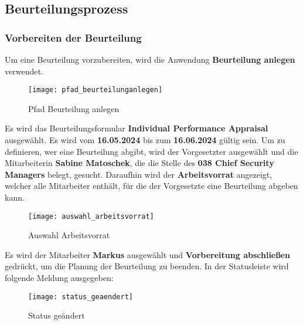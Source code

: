 \subsection{Beurteilungsprozess}

\subsubsection{Vorbereiten der Beurteilung}
Um eine Beurteilung vorzubereiten, wird die Anwendung \textbf{Beurteilung anlegen} verwendet.
\begin{figure}[H]
	\centering
	\texttt{[image: pfad\_beurteilunganlegen]}
	\caption{Pfad Beurteilung anlegen}
	\label{fig:pfad_beurteilunganlegen}
\end{figure}
Es wird das Beurteilungsformular \textbf{Individual Performance Appraisal} ausgewählt. Es wird vom \textbf{16.05.2024} bis zum \textbf{16.06.2024} gültig sein. Um zu definieren, wer eine Beurteilung abgibt, wird der Vorgesetzter ausgewählt und die Mitarbeiterin \textbf{Sabine Matoschek}, die die Stelle des \textbf{038 Chief Security Managers} belegt, gesucht. Daraufhin wird der \textbf{Arbeitsvorrat} angezeigt, welcher alle Mitarbeiter enthält, für die der Vorgesetzte eine Beurteilung abgeben kann.
\begin{figure}[H]
	\centering
	\texttt{[image: auswahl\_arbeitsvorrat]}
	\caption{Auswahl Arbeitsvorrat}
	\label{fig:auswahl_arbeitsvorrat}
\end{figure}
Es wird der Mitarbeiter \textbf{Markus} ausgewählt und \textbf{Vorbereitung abschließen} gedrückt, um die Planung der Beurteilung zu beenden. In der Statusleiste wird folgende Meldung ausgegeben:
\begin{figure}[H]
	\centering
	\texttt{[image: status\_geaendert]}
	\caption{Status geändert}
	\label{fig:status_geaendert}
\end{figure}

